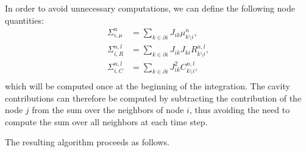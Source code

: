 \documentclass[
    preprint,
    linenumbers,
    amsmath,amssymb,amsfonts,
    aps, physrev,
    superscriptaddress,
    10pt,
    bibnotes
    ]{revtex4-2}
\begin{document}
In order to avoid unnecessary computations, we can define the following node quantities:
\begin{align}
  \Sigma_{i,\mu}^{n} & = \sum_{k\in \partial i}J_{ik}\mu_{k\setminus i}^n,\label{eq:sum_mu}\\
  \Sigma_{i,R}^{n,l} & = \sum_{k\in \partial i}J_{ik}J_{ki} R_{k\setminus i}^{n,l},\label{eq:sum_R}\\
  \Sigma_{i,C}^{n,l} & = \sum_{k\in \partial i}J_{ik}^2 C_{k\setminus i}^{n,l},\label{eq:sum_C}\\
\end{align}
which will be computed once at the beginning of the integration. The cavity contributions can therefore be computed by subtracting the contribution of the node $j$ from the sum over the neighbors of node $i$, thus avoiding the need to compute the sum over all neighbors at each time step.

The resulting algorithm proceeds as follows. 
\end{document}
